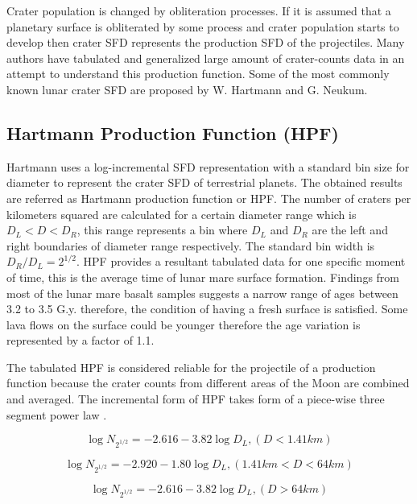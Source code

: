 \documentclass[11pt]{article}
\begin{document}
Crater population is changed by obliteration processes. If it is assumed that a planetary surface is obliterated by some process and crater population starts to develop then crater SFD represents the production SFD of the projectiles. Many authors have tabulated and generalized large amount of crater-counts data in an attempt to understand this production function. Some of the most commonly known lunar crater SFD are proposed by W. Hartmann and G. Neukum. 

\subsection{Hartmann Production Function (HPF)}
Hartmann uses a log-incremental SFD representation with a standard bin size for diameter to represent the crater SFD of terrestrial planets. The obtained results are referred as Hartmann production function or HPF. The number of craters per kilometers squared are calculated for a certain diameter range which is $D_{L} < D < D_{R}$, this range represents a bin where $D_{L}$ and $D_{R}$ are the left and right boundaries of diameter range respectively. The standard bin width is $D_{R}/D_{L} = 2^{1/2}$. HPF provides a resultant tabulated data for one specific moment of time, this is the average time of lunar mare surface formation. Findings from most of the lunar mare basalt samples suggests a narrow range of ages between 3.2 to 3.5 G.y. \cite{stoffler2001stratigraphy} therefore, the condition of having a fresh surface is satisfied. Some lava flows on the surface could be younger \cite{hiesinger2000ages} therefore the age variation is represented by a factor of 1.1.

The tabulated HPF is considered reliable for the projectile of a production function because the crater counts from different areas of the Moon are combined and averaged. The incremental form of HPF takes form of a piece-wise three segment power law \cite{ivanov2002comparison}.

\begin{equation}
\log N_{2^{1/2}} = -2.616 - 3.82 \log D_{L}, (D<1.41km)
\end{equation}

\begin{equation}
\log N_{2^{1/2}} = -2.920 - 1.80 \log D_{L},
(1.41km < D < 64km)
\end{equation}

\begin{equation}
\log N_{2^{1/2}} = -2.616 - 3.82 \log D_{L},
(D>64km)
\end{equation}
\end{document}

